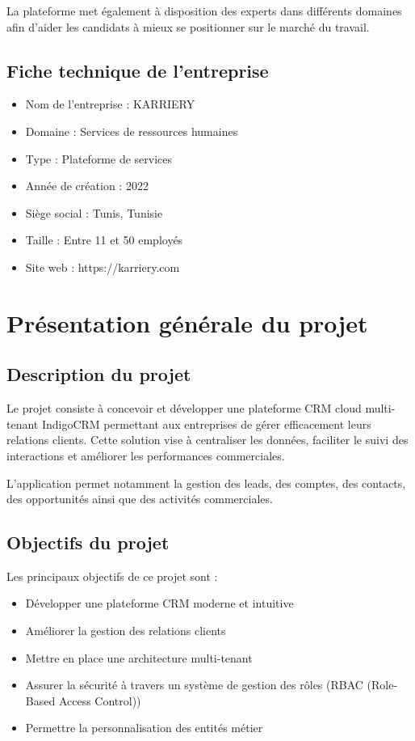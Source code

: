 \documentclass[12pt,a4paper,twoside,openany]{book}
\begin{document}
La plateforme met également à disposition des experts dans différents domaines afin d’aider les candidats à mieux se positionner sur le marché du travail.

\subsection{Fiche technique de l’entreprise}

\begin{itemize}
\item Nom de l’entreprise : KARRIERY
\item Domaine : Services de ressources humaines
\item Type : Plateforme de services
\item Année de création : 2022
\item Siège social : Tunis, Tunisie
\item Taille : Entre 11 et 50 employés
\item Site web : https://karriery.com
\end{itemize}

\section{Présentation générale du projet}

\subsection{Description du projet}

Le projet consiste à concevoir et développer une plateforme CRM cloud multi-tenant IndigoCRM permettant aux entreprises de gérer efficacement leurs relations clients. Cette solution vise à centraliser les données, faciliter le suivi des interactions et améliorer les performances commerciales.

L’application permet notamment la gestion des leads, des comptes, des contacts, des opportunités ainsi que des activités commerciales.

\subsection{Objectifs du projet}

Les principaux objectifs de ce projet sont :

\begin{itemize}
\item Développer une plateforme CRM moderne et intuitive
\item Améliorer la gestion des relations clients
\item Mettre en place une architecture multi-tenant
\item Assurer la sécurité à travers un système de gestion des rôles (RBAC (Role-Based Access Control))
\item Permettre la personnalisation des entités métier
\end{itemize}
\end{document}

